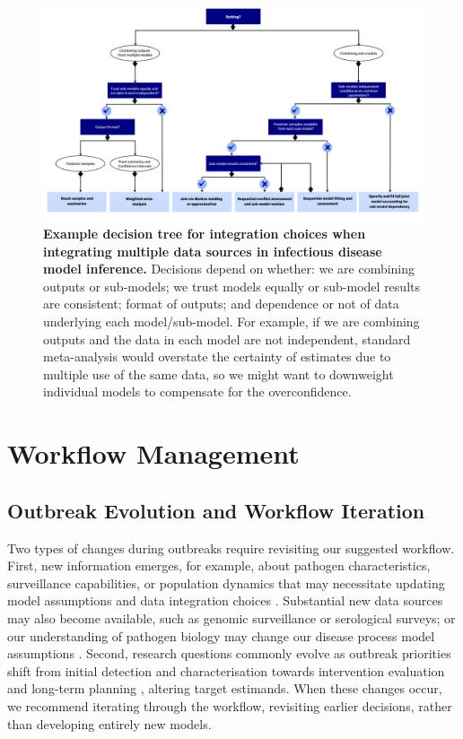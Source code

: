 \documentclass{article}
\begin{document}
\begin{figure}[htbp]
    \centering
    \includegraphics[width=\textwidth]{figures/Abbott et al figure 4.png}
    \caption{\textbf{Example decision tree for integration choices when integrating multiple data sources in infectious disease model inference.} Decisions depend on whether: we are combining outputs or sub-models; we trust models equally or sub-model results are consistent; format of outputs; and dependence or not of data underlying each model/sub-model. For example, if we are combining outputs and the data in each model are not independent, standard meta-analysis would overstate the certainty of estimates due to multiple use of the same data, so we might want to downweight individual models to compensate for the overconfidence.}
    \label{fig:integration}
\end{figure}

\section{Workflow Management}

\subsection{Outbreak Evolution and Workflow Iteration}  \label{sec:outbreak}
Two types of changes during outbreaks require revisiting our suggested workflow.
First, new information emerges, for example, about pathogen characteristics, surveillance capabilities, or population dynamics that may necessitate updating model assumptions and data integration choices \citep{mccaw2023role}. Substantial new data sources may also become available, such as genomic surveillance or serological surveys; or our understanding of pathogen biology may change our disease process model assumptions \citep{knock2021key}. 
Second, research questions commonly evolve as outbreak priorities shift from initial detection and characterisation towards intervention evaluation and long-term planning \citep{who-mosaic-2023}, altering target estimands.
When these changes occur, we recommend iterating through the workflow, revisiting earlier decisions, rather than developing entirely new models.
\end{document}
